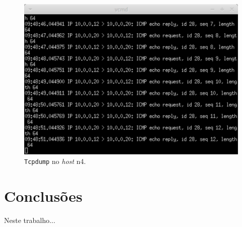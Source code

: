 \documentclass{llncs}
\begin{document}
\begin{figure}
  \begin{center}
	  \includegraphics[scale=0.3]{./imagens/n4_tcpdump_comutador.png} 
  \end{center}
	\caption{\texttt{Tcpdump} no \textit{host} n4.}
  \label{fig:n4_comutador}
\end{figure} 

\clearpage

\section{Conclusões}
Neste trabalho...



\end{document}
